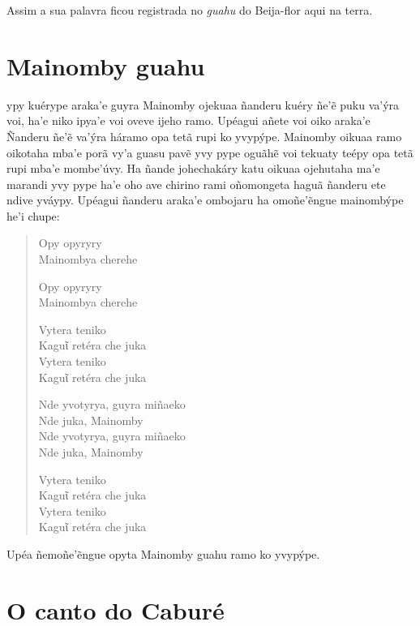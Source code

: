 

Assim a sua palavra ficou registrada no \textit{guahu} do Beija-flor aqui na terra.

\chapter{Mainomby guahu}

 ypy kuérype araka'e guyra Mainomby ojekuaa ñanderu kuéry ñe'ẽ puku
va'ýra voi, ha'e niko ipya'e voi oveve ijeho ramo. Upéagui añete voi
oiko araka'e Ñanderu ñe'ẽ va'ýra háramo opa tetã rupi ko yvypýpe.
Mainomby oikuaa ramo oikotaha mba'e porã vy'a guasu pavẽ yvy pype oguãhẽ
voi tekuaty teépy opa tetã rupi mba'e mombe'úvy. Ha ñande johechakáry
katu oikuaa ojehutaha ma'e marandi yvy pype ha'e oho ave chirino rami
oñomongeta haguã ñanderu ete ndive yváypy. Upéagui ñanderu araka'e
ombojaru ha omoñe'ẽngue mainombýpe he'i chupe:

\begin{verse}
Opy opyryry\\
Mainombya cherehe

Opy opyryry\\
Mainombya cherehe

Vytera teniko\\
Kaguῖ retéra che juka\\
Vytera teniko\\
Kaguῖ retéra che juka

Nde yvotyrya, guyra miñaeko\\
Nde juka, Mainomby\\
Nde yvotyrya, guyra miñaeko\\
Nde juka, Mainomby

\pagebreak
Vytera teniko\\
Kaguῖ retéra che juka\\
Vytera teniko\\
Kaguῖ retéra che juka
\end{verse}

Upéa ñemoñe'ẽngue opyta Mainomby guahu ramo ko yvypýpe.

\chapter{O canto do Caburé}


